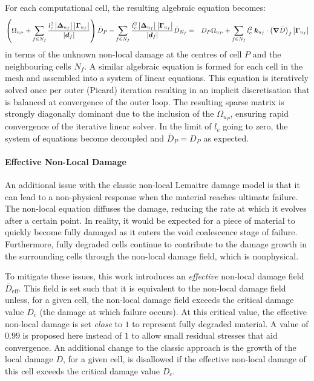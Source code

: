 \documentclass[sn-mathphys,Numbered]{sn-jnl}%
\newcommand{\bb}{\boldsymbol}
\begin{document}
For each computational cell, the resulting algebraic equation becomes:
\begin{eqnarray}
	\left(
		\Omega_{u_P}
		+ \sum_{f \in N_f}
		\frac{l_c^2 \left|\boldsymbol{\Delta}_{u_f} \right| \left| \bb{\Gamma}_{u_f} \right|}{\left|\bb{d}_f\right|}
	\right) \bar{D}_P
	- \sum_{f \in N_f}
	\frac{l_c^2 \left|\boldsymbol{\Delta}_{u_f}\right| \left|\bb{\Gamma}_{u_f} \right|}{\left|\bb{d}_f\right|} \bar{D}_{N_f}
	&=&
	D_P \Omega_{u_P}
	+ \sum_{f \in N_f} l_c^2 \; \bb{k}_{u_f} \cdot   \left(  \boldsymbol{\nabla} \bar{D}   \right)_f   \left|\bb{\Gamma}_{u_f}\right| \notag \\
\end{eqnarray}
in terms of the unknown non-local damage at the centres of cell $P$ and the neighbouring cells $N_f$.
A similar algebraic equation is formed for each cell in the mesh and assembled into a system of linear equations.
This equation is iteratively solved once per outer (Picard) iteration resulting in an implicit discretisation that is balanced at convergence of the outer loop.
The resulting sparse matrix is strongly diagonally dominant due to the inclusion of the $\Omega_{u_P}$, ensuring rapid convergence of the iterative linear solver.
In the limit of $l_c$ going to zero, the system of equations become decoupled and $\bar{D}_P = D_P$ as expected.


\paragraph{Effective Non-Local Damage} \label{sec:effNonLocalDam}
An additional issue with the classic non-local Lemaitre damage model is that it can lead to a non-physical response when the material reaches ultimate failure.
The non-local equation diffuses the damage, reducing the rate at which it evolves after a certain point.
In reality, it would be expected for a piece of material to quickly become fully damaged as it enters the void coalescence stage of failure.
Furthermore, fully degraded cells continue to contribute to the damage growth in the surrounding cells through the non-local damage field, which is nonphysical.

To mitigate these issues, this work introduces an \emph{effective} non-local damage field $\bar{D}_{\text{eff}}$.
This field is set such that it is equivalent to the non-local damage field unless, for a given cell, the non-local damage field exceeds the critical damage value $D_c$ (the damage at which failure occurs).
At this critical value, the effective non-local damage is set \emph{close} to $1$ to represent fully degraded material.
A value of $0.99$ is proposed here instead of $1$ to allow small residual stresses that aid convergence.
An additional change to the classic approach is the growth of the local damage $D$, for a given cell, is disallowed if the effective non-local damage of this cell exceeds the critical damage value $D_c$.
\end{document}
